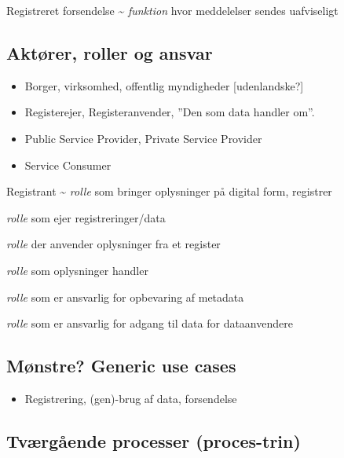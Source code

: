 Registreret forsendelse \textasciitilde{} \emph{funktion} hvor
meddelelser sendes uafviseligt

\subsection{Aktører, roller og
ansvar}\label{aktuxf8rer-roller-og-ansvar}

\begin{itemize}
\tightlist
\item
  Borger, virksomhed, offentlig myndigheder {[}udenlandske?{]}
\item
  Registerejer, Registeranvender, ''Den som data handler om''.
\item
  Public Service Provider, Private Service Provider
\item
  Service Consumer
\end{itemize}

Registrant \textasciitilde{} \emph{rolle} som bringer oplysninger på
digital form, registrer

\begin{description}
\tightlist
\item[Dataejer]
\emph{rolle} som ejer registreringer/data
\item[Dataanvender]
\emph{rolle} der anvender oplysninger fra et register
\item[Datasubject]
\emph{rolle} som oplysninger handler
\item[Dataindeksejer]
\emph{rolle} som er ansvarlig for opbevaring af metadata
\item[Datadistributør]
\emph{rolle} som er ansvarlig for adgang til data for dataanvendere
\end{description}

\subsection{Mønstre? Generic use
cases}\label{muxf8nstre-generic-use-cases}

\begin{itemize}
\tightlist
\item
  Registrering, (gen)-brug af data, forsendelse
\end{itemize}

\subsection{Tværgående processer
(proces-trin)}\label{tvuxe6rguxe5ende-processer-proces-trin}

